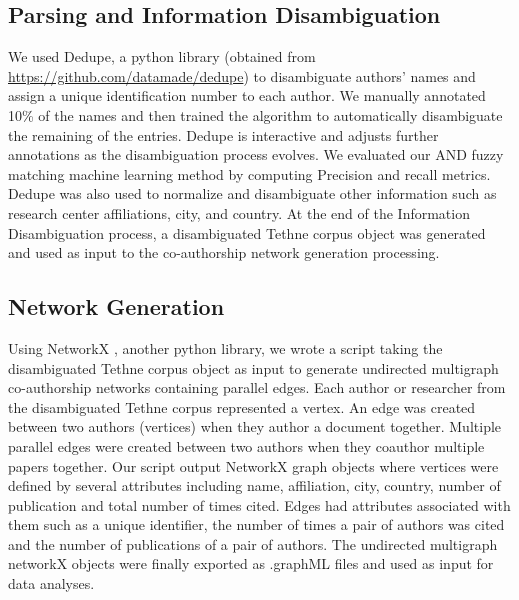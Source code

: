 \subsection{Parsing and Information Disambiguation}
\label{sec:meth_and}
We used Dedupe, a python library (obtained from \url{https://github.com/datamade/dedupe}) to disambiguate authors' names and assign a unique identification number to each author. We manually annotated 10\% of the names and then trained the algorithm to automatically disambiguate the remaining of the entries. Dedupe is interactive and adjusts further annotations as the disambiguation process evolves. 
We evaluated our AND fuzzy matching machine learning method by computing Precision and recall metrics. Dedupe was also used to normalize and disambiguate other information such as research center affiliations, city, and country. At the end of the Information Disambiguation process, a disambiguated Tethne corpus object was generated and used as input to the co-authorship network generation processing.


\subsection{Network Generation}
Using NetworkX \cite{schult_exploring_2008}, another python library, we wrote a script taking the disambiguated Tethne corpus object as input to generate undirected multigraph co-authorship networks containing parallel edges. Each author or researcher from the disambiguated Tethne corpus represented a vertex. An edge was created between two authors (vertices) when they author a document together. Multiple parallel edges were created between two authors when they coauthor multiple papers together. Our script output NetworkX graph objects where vertices were defined by several attributes including name, affiliation, city, country, number of publication and total number of times cited. Edges had attributes associated with them such as a unique identifier, the number of times a pair of authors was cited and the number of publications of a pair of authors. The undirected multigraph networkX objects were finally exported as .graphML files and used as input for data analyses.


